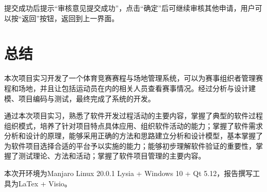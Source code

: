 \documentclass[a4paper,UTF8]{article}
\begin{document}
提交成功后提示“审核意见提交成功”，点击“确定”后可继续审核其他申请，用户可以按“返回”按钮，返回到上一界面。

\section{总结}
本次项目实习开发了一个体育竞赛赛程与场地管理系统，可以为赛事组织者管理赛程和场地，并且让包括运动员在内的相关人员查看赛事情况。经过分析与设计建模、项目编码与测试，最终完成了系统的开发。

通过本次项目实习，熟悉了软件开发过程活动的主要内容，掌握了典型的软件过程组织模式，培养了针对项目特点具体应用、组织软件活动的能力；掌握了软件需求分析和设计的原理，能够采用正确的方法和思路建立分析和设计模型，基本掌握了为软件项目选择合适的平台予以实施的能力；能够初步理解软件验证的重要性，掌握了测试理论、方法和活动；掌握了软件项目管理的主要内容。

本次开环境为Manjaro Linux 20.0.1 Lysia + Windows 10 + Qt 5.12，报告撰写工具为LaTex + Visio。
	
\end{document}
